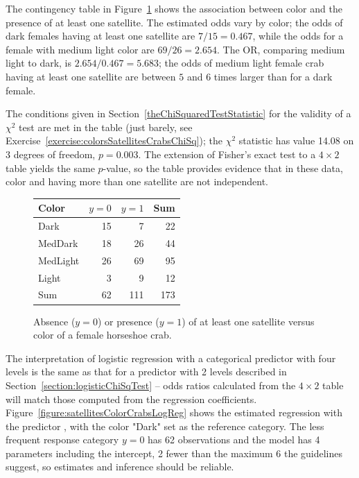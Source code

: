 The contingency table in Figure~\ref{figure:colorSatelliteCrabs} shows the association between color and the presence of at least one satellite.  The estimated odds vary by color; the odds of dark females having at least one satellite are $7/15 = 0.467$, while the odds for a female with medium light color are $69/26 = 2.654$. The OR, comparing medium light to dark, is $2.654/0.467 = 5.683$; the odds of medium light female crab having at least one satellite are between $5$ and $6$ times larger than for a dark female.

The conditions given in Section~\ref{theChiSquaredTestStatistic} for the validity of a $\chi^2$ test are met in the table (just barely, see Exercise~\ref{exercise:colorsSatellitesCrabsChiSq}); the $\chi^2$ statistic has value 14.08 on 3 degrees of freedom, $p = 0.003$.  The extension of Fisher's exact test to a $4 \times 2$ table yields the same $p$-value, so the table provides evidence that in these data, color and having more than one satellite are not independent.

\begin{figure}[ht]
\centering
\begin{tabular}{lrrr}
Color & $y = 0$ & $y = 1$ & Sum \\ \hline
Dark & 15 & 7 & 22 \\
MedDark & 18 & 26 & 44 \\
MedLight & 26 & 69 & 95 \\
Light & 3 & 9 & 12 \\ \hline
Sum & 62 & 111 & 173
\end{tabular}
\caption{Absence ($y = 0$) or presence ($y = 1$) of at least one satellite versus color of a female horseshoe crab.}
\label{figure:colorSatelliteCrabs}
\end{figure}

The interpretation of logistic regression with a categorical predictor with four levels is the same as that for a predictor with 2 levels described in Section~\ref{section:logisticChiSqTest}  --  odds ratios calculated from the $4 \times 2$ table will match those computed from the regression coefficients.  Figure~\ref{figure:satellitesColorCrabsLogReg} shows the estimated regression with the predictor , with the color "Dark" set as the reference category. The less frequent response category $y = 0$ has 62 observations and the model has 4 parameters including the intercept, 2 fewer than the maximum 6 the guidelines suggest, so estimates and inference should be reliable.


